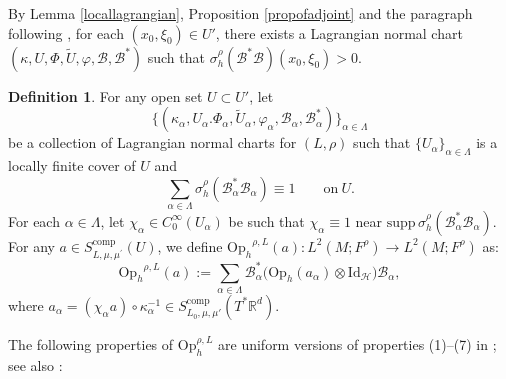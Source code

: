 \documentclass[11pt,oneside,reqno]{amsart}
\newcommand\Oph{\ensuremath{\mathrm{Op}_h}}
\theoremstyle{definition}
\newtheorem{definition}{Definition}[section]
\newtheorem{remark}[definition]{Remark}
\numberwithin{equation}{section}
\theoremstyle{plain}
\begin{document}
By Lemma \ref{locallagrangian}, Proposition \ref{propofadjoint} and the paragraph following \cite[(2.12)]{dyatlovzahl2016spectral}, for each $(x_0, \xi_0) \in U'$, there exists a Lagrangian normal chart $(\kappa, U, \Phi,\widetilde{U},\varphi,\mathcal{B}, \mathcal{B}^*)$ such that $\sigma_h^{\rho}(\mathcal{B}^* \mathcal{B})(x_0, \xi_0)>0$.

\begin{definition}\label{defofquantizationofaniso}
For any open set $U\subset U'$, let 
\begin{equation*}
    \big\{ (\kappa_{\alpha}, U_{\alpha}. \Phi_{\alpha}, \widetilde{U}_{\alpha}, \varphi_{\alpha},\mathcal{B}_{\alpha},\mathcal{B}_{\alpha}^*) \big\}_{\alpha\in \Lambda}
\end{equation*}
be a collection of Lagrangian normal charts for $(L,\rho)$ such that $\{U_\alpha \}_{\alpha \in \Lambda}$ is a locally finite cover of $U$ and
\begin{equation*}
    \sum\limits_{\alpha \in \Lambda}\sigma^{\rho}_{h} (\mathcal{B}_{\alpha}^{*} \mathcal{B}_{\alpha} ) \equiv 1 \qquad \text{on} \ U.
\end{equation*}
For each $\alpha \in \Lambda$, let $\chi_\alpha\in C_{0}^{\infty}(U_{\alpha})$ be such that $\chi_{\alpha}\equiv 1$ near $\mathrm{supp}\,\sigma^\rho_h(\mathcal{B}_{\alpha}^{*} \mathcal{B}_{\alpha})$. For any $a\in S^{\mathrm{comp}}_{L,\mu,\mu^{\prime}}(U)$, we define $\Oph^{\rho,L}(a): L^{2}(M;F^{\rho}) \to L^{2}(M;F^{\rho})$ as: 
\begin{equation}
\Oph^{\rho,L}(a):=\sum_{\alpha\in \Lambda} \mathcal{B}_{\alpha}^*  \big(\mathrm{Op}_h(a_\alpha) \otimes \mathrm{Id}_{\mathcal{H}} \big)\mathcal{B}_{\alpha},
\end{equation}
where $a_\alpha = (\chi_{\alpha} a) \circ \kappa_{\alpha}^{-1} \in S_{L_0, \mu, \mu' }^{\mathrm{comp}}(T^* \mathbb{R}^d) $.
\end{definition}



The following properties of $\mathrm{Op}_h^{\rho,L}$ are uniform versions of properties (1)–(7) in \cite[Appendix A.4]{dyatlov2018semiclassical}; see also \cite[Lemma 3.12 \& Lemma 3.14]{dyatlovzahl2016spectral}:
\end{document}

